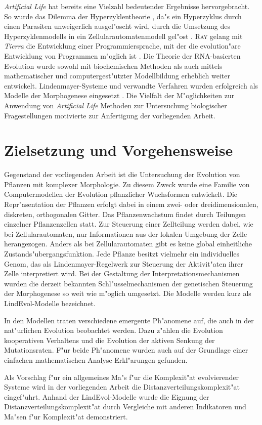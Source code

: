 \textsl{Artificial Life} hat bereits eine Vielzahl bedeutender Ergebnisse hervorgebracht. So wurde das Dilemma der Hyperzyklentheorie
\cite{Eigen71}, da"s ein Hyperzyklus durch einen Parasiten unweigerlich ausgel"oscht wird, durch die Umsetzung des Hyperzyklenmodells
in ein Zellularautomatenmodell gel"ost \cite{Boerlijst92}. \textsc{Ray} gelang mit \textsl{Tierra} die Entwicklung einer
Programmiersprache, mit der
die evolution"are Entwicklung von Programmen m"oglich ist \cite{Ray92}. Die Theorie der RNA-basierten Evolution wurde sowohl mit
biochemischen Methoden \cite{Joyce92} als auch mittels mathematischer und computergest"utzter Modellbildung \cite{Forst95,Schuster94}
erheblich weiter entwickelt. Lindenmayer-Systeme und verwandte Verfahren wurden erfolgreich als Modelle der Morphogenese
eingesetzt \cite{deBoer92,Hamilton93,Prusinkiewicz94}. Die Vielfalt der M"oglichkeiten zur Anwendung von
\textsl{Artificial Life} Methoden
zur Untersuchung biologischer Fragestellungen \cite{Taylor94} motivierte zur Anfertigung der vorliegenden Arbeit.

    
\section{Zielsetzung und Vorgehensweise}

Gegenstand der vorliegenden Arbeit ist die Untersuchung der Evolution von Pflanzen mit komplexer Morphologie.
Zu diesem Zweck wurde eine Familie von Computermodellen der Evolution pflanzlicher Wuchsformen entwickelt.
Die Repr"asentation der Pflanzen erfolgt dabei in einem zwei- oder dreidimensionalen, diskreten, orthogonalen Gitter. Das
Pflanzenwachstum findet durch Teilungen einzelner Pflanzenzellen statt. Zur Steuerung einer Zellteilung werden dabei, wie
bei Zellularautomaten, nur Informationen aus der lokalen Umgebung der Zelle herangezogen. Anders als bei Zellularautomaten
gibt es keine global einheitliche Zustands"ubergangsfunktion. Jede Pflanze besitzt vielmehr ein individuelles Genom, das
als Lindenmayer-Regelwerk zur Steuerung der Aktivit"aten ihrer Zelle interpretiert wird. Bei der Gestaltung der
Interpretationsmechanismen wurden die derzeit bekannten Schl"usselmechanismen der genetischen Steuerung der Morphogenese so
weit wie m"oglich umgesetzt. Die Modelle werden kurz als LindEvol-Modelle bezeichnet.

In den Modellen traten verschiedene emergente Ph"anomene auf, die auch in der nat"urlichen Evolution beobachtet
werden. Dazu z"ahlen die Evolution kooperativen Verhaltens und die Evolution der aktiven Senkung der Mutationsraten.
F"ur beide Ph"anomene wurden auch auf der Grundlage einer einfachen mathematischen Analyse Erkl"arungen gefunden.

Als Vorschlag f"ur ein allgemeines Ma"s f"ur die Komplexit"at evolvierender Systeme wird in der vorliegenden Arbeit
die Distanzverteilungskomplexit"at eingef"uhrt. Anhand der LindEvol-Modelle wurde die Eignung der Distanzverteilungskomplexit"at
durch Vergleiche mit anderen Indikatoren und Ma"sen f"ur Komplexit"at demonstriert.

